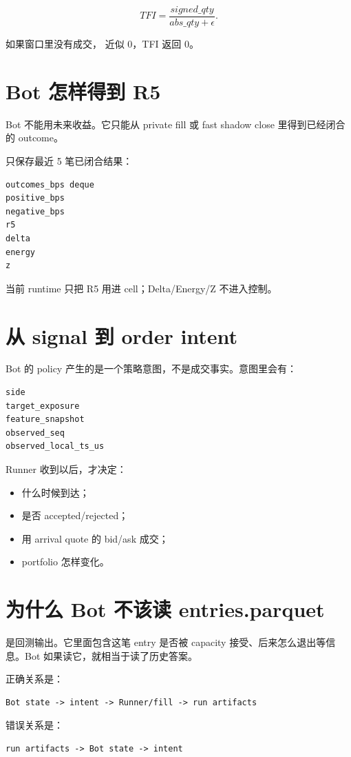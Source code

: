 \[
TFI=\frac{signed\_qty}{abs\_qty+\epsilon}.
\]

如果窗口里没有成交， 近似 0，TFI 返回 0。

\section{Bot 怎样得到 R5}

Bot 不能用未来收益。它只能从 private fill 或 fast shadow close 里得到已经闭合的 outcome。

 只保存最近 5 笔已闭合结果：

\begin{lstlisting}
outcomes_bps deque
positive_bps
negative_bps
r5
delta
energy
z
\end{lstlisting}

当前 runtime 只把 R5 用进 cell；Delta/Energy/Z 不进入控制。

\section{从 signal 到 order intent}

Bot 的 policy 产生的是一个策略意图，不是成交事实。意图里会有：

\begin{lstlisting}
side
target_exposure
feature_snapshot
observed_seq
observed_local_ts_us
\end{lstlisting}

Runner 收到以后，才决定：

\begin{itemize}[leftmargin=2em]
  \item 什么时候到达；
  \item 是否 accepted/rejected；
  \item 用 arrival quote 的 bid/ask 成交；
  \item portfolio 怎样变化。
\end{itemize}

\section{为什么 Bot 不该读 entries.parquet}

 是回测输出。它里面包含这笔 entry 是否被 capacity 接受、后来怎么退出等信息。Bot 如果读它，就相当于读了历史答案。

正确关系是：

\begin{lstlisting}
Bot state -> intent -> Runner/fill -> run artifacts
\end{lstlisting}

错误关系是：

\begin{lstlisting}
run artifacts -> Bot state -> intent
\end{lstlisting}

